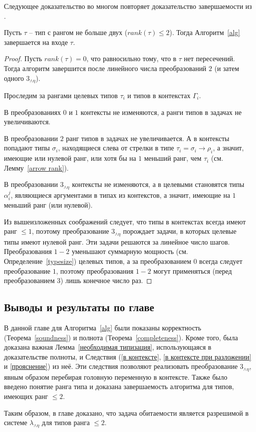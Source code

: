 \documentclass[../main.tex]{subfiles}
\begin{document}
Следующее доказательство во многом повторяет доказательство завершаемости из \cite{kusmierek_2007}.
\begin{theorem}[Termination] \label{termination}
Пусть $\tau$ -- тип с рангом не больше двух ($rank(\tau) \leqslant 2$). Тогда Алгоритм~\ref{alg} завершается на входе $\tau$.
\end{theorem}
\begin{proof}
    Пусть $rank(\tau) = 0$, что равносильно тому, что в $\tau$ нет пересечений. Тогда алгоритм завершится после линейного числа преобразований $2$ (и затем одного $3_{\wedge \eta}$).
    
    Проследим за рангами целевых типов $\tau_i$ и типов в контекстах $\Gamma_i$.
    
    В преобразованиях $0$ и $1$ контексты не изменяются, а ранги типов в задачах не увеличиваются.
    
    В преобразовании $2$ ранг типов в задачах не увеличивается. А в контексты попадают 
    типы $\sigma_i$, находящиеся слева от стрелки в типе $\tau_i = \sigma_i \to \rho_i$, а значит, имеющие или нулевой ранг, или хотя бы на $1$ меньший ранг, чем $\tau_i$ (см. Лемму~\ref{arrow rank}). 
    
    В преобразовании $3_{\wedge \eta}$ контексты не изменяются, а в целевыми становятся типы $\alpha_i^j$, являющиеся аргументами в типах из контекстов, а значит, имеющие на $1$ меньший ранг (или нулевой).
    
    Из вышеизложенных соображений следует, что типы в контекстах всегда имеют ранг $\leqslant 1$, поэтому преобразование $3_{\wedge \eta}$ порождает задачи, в которых целевые типы имеют нулевой ранг. Эти задачи решаются за линейное число шагов. 
    Преобразования $1-2$ уменьшают суммарную мощность (см. Определение~\ref{typesize}) целевых типов, а за преобразованием $0$ всегда следует преобразование $1$, поэтому преобразования $1-2$ могут применяться (перед преобразованием $3$) лишь конечное число раз.
    
    
\end{proof}

\subsection{Выводы и результаты по главе}

В данной главе для Алгоритма~\ref{alg} были показаны корректность (Теорема~\ref{soundness}) и полнота (Теорема~\ref{completeness}). Кроме того, была доказана важная Лемма~\ref{необходимая типизация}, использующаяся в доказательстве полноты, и Следствия (\ref{в контексте}, \ref{в контексте при разложении} и \ref{прояснение}) из неё. Эти следствия позволяют реализовать преобразование $3_{\wedge \eta}$, явным образом перебирая головную переменную в контексте. Также было введено понятие ранга типа и доказана завершаемость алгоритма для типов, имеющих ранг $\leqslant 2$.

Таким образом, в главе доказано, что задача обитаемости является разрешимой в системе $\lambda_{\wedge \eta}$ для типов ранга $\leqslant 2$.
\end{document}
